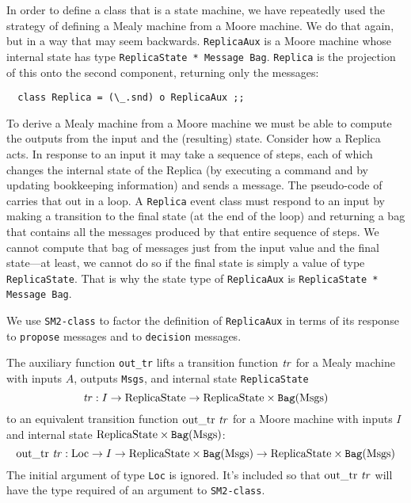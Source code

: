 \documentclass[final]{article}
\newcommand{\listinline}[1]{\text{\lstinline{#1}}}
\begin{document}
In order to define a class that is a state machine, we have repeatedly
used the strategy of defining a Mealy machine from a Moore machine.
We do that again, but in a way that may seem backwards.
\lstinline{ReplicaAux} is a Moore machine whose internal state has
type
%
\lstinline{ReplicaState * Message Bag}.  \lstinline{Replica} is the
projection of this onto the second component, returning only the
messages:
\begin{lstlisting}
  class Replica = (\_.snd) o ReplicaAux ;;
\end{lstlisting}

To derive a Mealy machine from a Moore machine we must be able to
compute the outputs from the input and the (resulting) state.
Consider how a Replica acts.  In response to an input it may take a
sequence of steps, each of which changes the internal state of the
Replica (by executing a command and by updating bookkeeping
information) and sends a message.  The pseudo-code
of~\cite{VanRenesse:2011} carries that out in a loop.  A
\lstinline{Replica} event class must respond to an input by making a
transition to the final state (at the end of the loop) and returning a
bag that contains all the messages produced by that entire sequence of
steps.  We cannot compute that bag of messages just from the input
value and the final state---at least, we cannot do so if the final
state is simply a value of type \lstinline{ReplicaState}.  That is why
the state type of \lstinline{ReplicaAux} is
%
\lstinline{ReplicaState * Message Bag}.

We use \lstinline{SM2-class} to factor the definition of
\lstinline{ReplicaAux} in terms of its response to \lstinline{propose}
messages and to \lstinline{decision} messages.

The auxiliary function \lstinline{out_tr} lifts a transition function
$\mathit{tr}$ for a Mealy machine with inputs $A$, outputs
\lstinline{Msgs}, and internal state \lstinline{ReplicaState}
\[
\NUPRL{tr}: \NUPRLarrow{I}
    {\NUPRLarrow{\listinline{ReplicaState}}
                {\NUPRLprod{\listinline{ReplicaState}}
                           {\NUPRLbag{\listinline{Msgs}}}}}
\]
to an equivalent transition function $\listinline{out_tr}~\NUPRL{tr}$
for a Moore machine with inputs $I$ and internal state
$\NUPRLprod{\listinline{ReplicaState}}
{\NUPRLbag{\listinline{Msgs}}}$:
\[
\listinline{out_tr}~\NUPRL{tr} :
\NUPRLarrow{\listinline{Loc}}
{\NUPRLarrow{I}
    {\NUPRLarrow{\NUPRLprod{\listinline{ReplicaState}}
                           {\NUPRLbag{\listinline{Msgs}}}}
                {\NUPRLprod{\listinline{ReplicaState}}
                           {\NUPRLbag{\listinline{Msgs}}}}}}
\]
The initial argument of type \lstinline{Loc} is ignored.  It's
included so that $\listinline{out_tr}~\NUPRL{tr}$ will have the type
required of an argument to \lstinline{SM2-class}.
\end{document}
